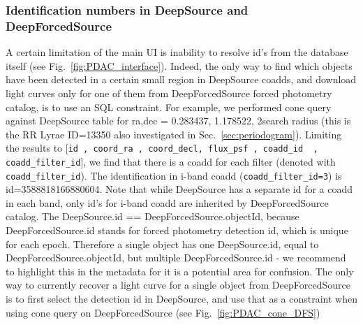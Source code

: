 \documentclass[DM,lsstdraft,toc]{lsstdoc}
\begin{document}
\subsubsection{Identification numbers in DeepSource and DeepForcedSource}
A certain limitation of the main UI is inability to resolve id's from the database itself (see Fig.~\ref{fig:PDAC_interface}). Indeed, the only way to find which objects have been detected in a certain small region in DeepSource coadds, and download light curves only for one of them  from DeepForcedSource forced photometry catalog, is  to use an  SQL constraint.   For example,  we performed cone query against DeepSource table for ra,dec = 0.283437\degree, 1.178522\degree, 2\arcsec search radius (this is the RR Lyrae ID=13350 also investigated in Sec.~\ref{sec:periodogram}). Limiting the results to [\verb|id , coord_ra , coord_decl, flux_psf , coadd_id  , coadd_filter_id|], we find that there is a coadd for each filter (denoted with \verb|coadd_filter_id|). The identification in i-band coadd (\verb|coadd_filter_id=3|) is id=3588818166880604.  Note that while DeepSource has a separate id for a coadd in each band, only id's for  i-band coadd are inherited by DeepForcedSource  catalog. The DeepSource.id == DeepForcedSource.objectId,  because  DeepForcedSource.id  stands for forced photometry detection id, which is unique for each epoch. Therefore a single object has one DeepSource.id,  equal to DeepForcedSource.objectId, but  multiple  DeepForcedSource.id  - we recommend to highlight this in the metadata for it is a potential area for confusion. The only way to currently recover a light curve for a single object from DeepForcedSource is to  first select the detection id  in DeepSource, and use that as a constraint when using cone query  on DeepForcedSource (see Fig.~\ref{fig:PDAC_cone_DFS})
\end{document}
